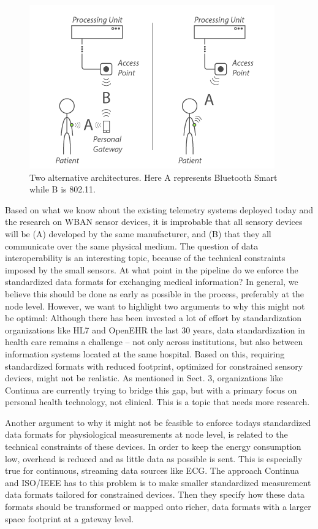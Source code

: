 \begin{figure}[H]
\centering
\includegraphics[scale=0.78]{img/figures/architecture.png}
\caption{Two alternative architectures. Here A represents Bluetooth Smart while B is 802.11.}
\label{fig:architecture}
\end{figure}

\noindent
Based on what we know about the existing telemetry systems deployed today and the research on WBAN sensor devices, it is improbable that all sensory devices will be (A) developed by the same manufacturer, and (B) that they all communicate over the same physical medium. The question of data interoperability is an interesting topic, because of the technical constraints imposed by the small sensors. At what point in the pipeline do we enforce the standardized data formats for exchanging medical information? In general, we believe this should be done as early as possible in the process, preferably at the node level. However, we want to highlight two arguments to why this might not be optimal: Although there has been invested a lot of effort by standardization organizations like HL7 and OpenEHR the last 30 years, data standardization in health care remains a challenge -- not only across institutions, but also between information systems located at the same hospital. Based on this, requiring standardized formats with reduced footprint, optimized for constrained sensory devices, might not be realistic. As mentioned in Sect. 3, organizations like Continua are currently trying to bridge this gap, but with a primary focus on personal health technology, not clinical. This is a topic that needs more research.

Another argument to why it might not be feasible to enforce todays standardized data formats for physiological measurements at node level, is related to the technical constraints of these devices. In order to keep the energy consumption low, overhead is reduced and as little data as possible is sent. This is especially true for continuous, streaming data sources like ECG. The approach Continua and ISO/IEEE has to this problem is to make smaller standardized measurement data formats tailored for constrained devices. Then they specify how these data formats should be transformed or mapped onto richer, data formats with a larger space footprint at a gateway level.


